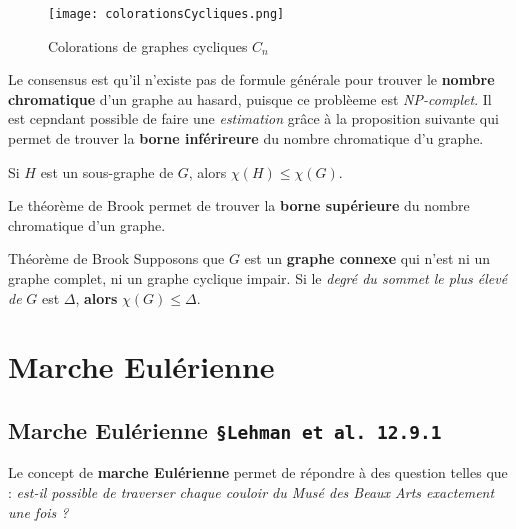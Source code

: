 \documentclass[16pt]{report}
\begin{document}
\begin{multicols*}{2}
            \begin{figure}[H]
                \begin{center}
                    \texttt{[image: colorationsCycliques.png]}
                \end{center}
                \caption{Colorations de graphes cycliques $C_n$}
            \end{figure}


            Le consensus est qu'il n'existe pas de formule générale pour trouver le \textbf{nombre chromatique}
            d'un graphe au hasard, puisque ce problèeme est \textit{NP-complet}. Il est cepndant possible 
            de faire une \textit{estimation} grâce à la proposition suivante qui permet de trouver 
            la \textbf{borne inférireure} du nombre chromatique d'u graphe.   

            \begin{prop}{}{}
                Si $H$ est un sous-graphe de $G$, alors $\chi(H) \leq \chi(G)$. 
            \end{prop}


            Le théorème de Brook permet de trouver la \textbf{borne supérieure} du nombre chromatique d'un graphe.
            \begin{Theorem}{Théorème de Brook}{}
                Supposons que $G$ est un \textbf{graphe connexe} qui n'est ni un graphe complet, ni un graphe       
                cyclique impair. Si le \textit{degré du sommet le plus élevé de} $G$ est $\Delta$, \textbf{alors} 
                $\chi(G) \leq \Delta$. 

                
            \end{Theorem}


            
            

    \chapter{Marche Eulérienne}



    \section{Marche Eulérienne  \texttt{\small{\S Lehman et al. 12.9.1}}}

            \begin{Concept}{}{}
                Le concept de \textbf{marche Eulérienne} permet de répondre à des question telles que : 
                \textit{est-il possible de traverser chaque couloir du Musé des Beaux Arts exactement une fois ?}  
            \end{Concept}



\end{multicols*}
\end{document}
